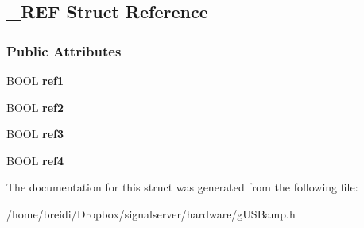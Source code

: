 \hypertarget{struct___r_e_f}{
\subsection{\_\-REF Struct Reference}
\label{struct___r_e_f}
}
\subsubsection*{Public Attributes}
\begin{DoxyCompactItemize}
\item 
\hypertarget{struct___r_e_f_adfbe4211043583154920131a13bcab1f}{
BOOL {\bfseries ref1}}
\label{struct___r_e_f_adfbe4211043583154920131a13bcab1f}

\item 
\hypertarget{struct___r_e_f_a2b79821499ed7f26af99d09810d5b30b}{
BOOL {\bfseries ref2}}
\label{struct___r_e_f_a2b79821499ed7f26af99d09810d5b30b}

\item 
\hypertarget{struct___r_e_f_a8f61eedb572bdefef90171d9e34ab513}{
BOOL {\bfseries ref3}}
\label{struct___r_e_f_a8f61eedb572bdefef90171d9e34ab513}

\item 
\hypertarget{struct___r_e_f_a5f47aad7856bc389452cbcd93ce1f3c7}{
BOOL {\bfseries ref4}}
\label{struct___r_e_f_a5f47aad7856bc389452cbcd93ce1f3c7}

\end{DoxyCompactItemize}


The documentation for this struct was generated from the following file:\begin{DoxyCompactItemize}
\item 
/home/breidi/Dropbox/signalserver/hardware/gUSBamp.h\end{DoxyCompactItemize}
